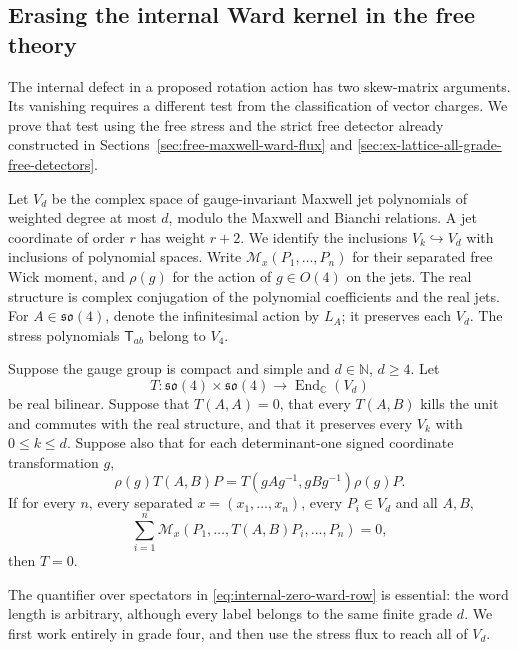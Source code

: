 \subsection{Erasing the internal Ward kernel in the free theory}
\label{sec:free-internal-ward-erasure}

The internal defect in a proposed rotation action has two skew-matrix
arguments. Its vanishing requires a different test from the classification
of vector charges. We prove that test using the free stress and the
strict free detector already constructed in
Sections~\ref{sec:free-maxwell-ward-flux} and
\ref{sec:ex-lattice-all-grade-free-detectors}.

Let $V_d$ be the complex space of gauge-invariant Maxwell jet polynomials
of weighted degree at most $d$, modulo the Maxwell and Bianchi relations.
A jet coordinate of order $r$ has weight $r+2$. We identify the inclusions
$V_k\hookrightarrow V_d$ with inclusions of polynomial spaces. Write
$\mathcal M_x(P_1,\ldots,P_n)$ for their separated free Wick moment, and
$\rho(g)$ for the action of $g\in O(4)$ on the jets. The real structure is
complex conjugation of the polynomial coefficients and the real jets.
For $A\in\mathfrak{so}(4)$, denote the infinitesimal action by $L_A$;
it preserves each $V_d$. The stress polynomials $\mathsf T_{ab}$ belong
to $V_4$.

\begin{theorem}
\label{thm:free-internal-erasure}
Suppose the gauge group is compact and simple and $d\in\mathbb N$, $d\geq4$. Let
\[
 T:\mathfrak{so}(4)\times\mathfrak{so}(4)
       \longrightarrow\operatorname{End}_{\mathbb C}(V_d)
\]
be real bilinear. Suppose that $T(A,A)=0$, that every $T(A,B)$ kills
the unit and commutes with the real structure, and that it preserves
every $V_k$ with $0\leq k\leq d$. Suppose also that for each determinant-one
signed coordinate transformation $g$,
\begin{equation}\label{eq:internal-signed-covariance}
 \rho(g)T(A,B)P
 =T(gAg^{-1},gBg^{-1})\rho(g)P.
\end{equation}
If for every $n$, every separated $x=(x_1,\ldots,x_n)$, every
$P_i\in V_d$ and all $A,B$,
\begin{equation}\label{eq:internal-zero-ward-row}
 \sum_{i=1}^n\mathcal M_x
       (P_1,\ldots,T(A,B)P_i,\ldots,P_n)=0,
\end{equation}
then $T=0$.
\end{theorem}

The quantifier over spectators in \eqref{eq:internal-zero-ward-row}
is essential: the word length is arbitrary, although every label belongs
to the same finite grade $d$. We first work entirely in grade four, and
then use the stress flux to reach all of $V_d$.


